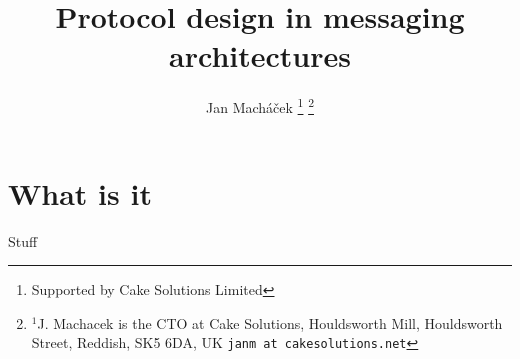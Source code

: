 



\title{Protocol design in messaging architectures}

\author{Jan Mach{\'a}\v{c}ek%
\thanks{Supported by Cake Solutions Limited}%
\thanks{$^{1}$J. Machacek is the CTO at Cake Solutions, Houldsworth Mill, Houldsworth Street, Reddish, SK5 6DA, UK {\tt\small janm at cakesolutions.net}}%
}




\section{What is it}
Stuff

\printbibliography

